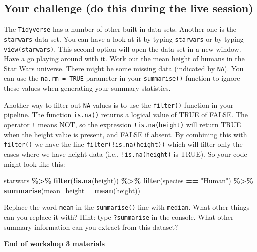 \documentclass[
]{book}
\newenvironment{Shaded}{\begin{snugshade}}{\end{snugshade}}
\newcommand{\AttributeTok}[1]{\textcolor[rgb]{0.13,0.29,0.53}{#1}}
\newcommand{\FunctionTok}[1]{\textcolor[rgb]{0.13,0.29,0.53}{\textbf{#1}}}
\newcommand{\NormalTok}[1]{#1}
\newcommand{\SpecialCharTok}[1]{\textcolor[rgb]{0.81,0.36,0.00}{\textbf{#1}}}
\newcommand{\StringTok}[1]{\textcolor[rgb]{0.31,0.60,0.02}{#1}}
\begin{document}
\hypertarget{your-challenge-do-this-during-the-live-session}{%
\subsection{Your challenge (do this during the live session)}\label{your-challenge-do-this-during-the-live-session}}

The \texttt{Tidyverse} has a number of other built-in data sets. Another one is the \texttt{starwars} data set. You can have a look at it by typing \texttt{starwars} or by typing \texttt{view(starwars)}. This second option will open the data set in a new window. Have a go playing around with it. Work out the mean height of humans in the Star Wars universe. There might be some missing data (indicated by \texttt{NA}). You can use the \texttt{na.rm\ =\ TRUE} parameter in your \texttt{summarise()} function to ignore these values when generating your summary statistics.

Another way to filter out \texttt{NA} values is to use the \texttt{filter()} function in your pipeline. The function \texttt{is.na()} returns a logical value of TRUE of FALSE. The operator \texttt{!} means NOT, so the expression \texttt{!is.na(height)} will return TRUE when the height value is present, and FALSE if absent. By combining this with \texttt{filter()} we have the line \texttt{filter(!is.na(height))} which will filter only the cases where we have height data (i.e., \texttt{!is.na(height)} is TRUE). So your code might look like this:

\begin{Shaded}
\begin{Highlighting}[]
\NormalTok{starwars }\SpecialCharTok{\%\textgreater{}\%}
  \FunctionTok{filter}\NormalTok{(}\SpecialCharTok{!}\FunctionTok{is.na}\NormalTok{(height)) }\SpecialCharTok{\%\textgreater{}\%}
  \FunctionTok{filter}\NormalTok{(species }\SpecialCharTok{==} \StringTok{"Human"}\NormalTok{) }\SpecialCharTok{\%\textgreater{}\%}
  \FunctionTok{summarise}\NormalTok{(}\AttributeTok{mean\_height =} \FunctionTok{mean}\NormalTok{(height))}
\end{Highlighting}
\end{Shaded}

Replace the word \texttt{mean} in the \texttt{summarise()} line with \texttt{median}. What other things can you replace it with? Hint: type \texttt{?summarise} in the console. What other summary information can you extract from this dataset?

\textbf{End of workshop 3 materials}
\end{document}
